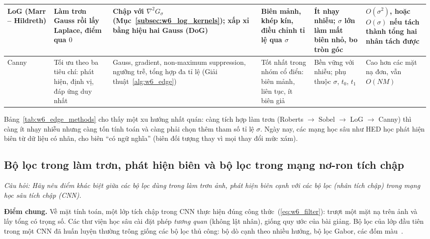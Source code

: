 \begin{table}[!htbp]
\begin{tabularx}{\textwidth}{|p{1.5cm}|p{2.0cm}|X|X|X|p{1.5cm}|}
\hline
LoG (Marr -- Hildreth) \citep{marr1980theory} & Làm trơn Gauss rồi lấy Laplace, điểm qua $0$ & Chập với $\nabla^2 G_\sigma$ (Mục~\ref{subsec:w6_log_kernels}); xấp xỉ bằng hiệu hai Gauss (DoG) & Biên mảnh, khép kín, điều chỉnh tỉ lệ qua $\sigma$ & Ít nhạy nhiễu; $\sigma$ lớn làm mất biên nhỏ, bo tròn góc & $O(\sigma^2)$, hoặc $O(\sigma)$ nếu tách thành tổng hai nhân tách được \\
\hline
Canny~\citep{canny1986computational} & Tối ưu theo ba tiêu chí: phát hiện, định vị, đáp ứng duy nhất & Gauss, gradient, non-maximum suppression, ngưỡng trễ, tổng hợp đa tỉ lệ (Giải thuật~\ref{alg:w6_edge}) & Tốt nhất trong nhóm cổ điển: biên mảnh, liên tục, ít biên giả & Bền vững với nhiễu; phụ thuộc $\sigma$, $t_0$, $t_1$ & Cao hơn các mặt nạ đơn, vẫn $O(NM)$ \\
\hline
\end{tabularx}
\end{table}

Bảng~\ref{tab:w6_edge_methods} cho thấy một xu hướng nhất quán: càng tích hợp làm trơn (Roberts $\to$ Sobel $\to$ LoG $\to$ Canny) thì càng ít nhạy nhiễu nhưng càng tốn tính toán và càng phải chọn thêm tham số tỉ lệ $\sigma$. Ngày nay, các mạng học sâu như HED học phát hiện biên từ dữ liệu có nhãn, cho biên ``có ngữ nghĩa'' (biên đối tượng thay vì mọi thay đổi mức xám).

\subsection{Bộ lọc trong làm trơn, phát hiện biên và bộ lọc trong mạng nơ-ron tích chập}
\label{subsec:w6_filter_vs_cnn}

\textit{Câu hỏi: Hãy nêu điểm khác biệt giữa các bộ lọc dùng trong làm trơn ảnh, phát hiện biên cạnh với các bộ lọc (nhân tích chập) trong mạng học sâu tích chập (CNN).}

\textbf{Điểm chung.} Về mặt tính toán, một lớp tích chập trong CNN thực hiện đúng công thức~(\ref{eq:w6_filter}): trượt một mặt nạ trên ảnh và lấy tổng có trọng số. Các thư viện học sâu cài đặt phép \emph{tương quan} (không lật nhân), giống quy ước của bài giảng. Bộ lọc của lớp đầu tiên trong một CNN đã huấn luyện thường trông giống các bộ lọc thủ công: bộ dò cạnh theo nhiều hướng, bộ lọc Gabor, các đốm màu~\citep{krizhevsky2012imagenet,zeiler2014visualizing}.

